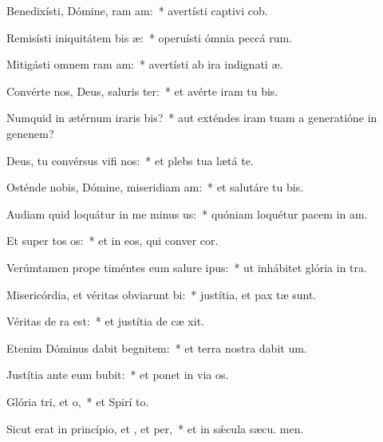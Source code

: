 \item Benedixísti, Dómine, ram am:~* avertísti captivi cob.
\item Remisísti iniquitátem bis æ:~* operuísti ómnia peccá rum.
\item Mitigásti omnem ram am:~* avertísti ab ira indignati æ.
\item Convérte nos, Deus, saluris ter:~* et avérte iram tu  bis.
\item Numquid in ætérnum iraris bis?~* aut exténdes iram tuam a generatióne in genenem?
\item Deus, tu convérsus vifi nos:~* et plebs tua lætá  te.
\item Osténde nobis, Dómine, miseridiam am:~* et salutáre tu  bis.
\item Audiam quid loquátur in me minus us:~* quóniam loquétur pacem in  am.
\item Et super tos os:~* et in eos, qui conver  cor.
\item Verúmtamen prope timéntes eum salure ipus:~* ut inhábitet glória in  tra.
\item Misericórdia, et véritas obviarunt bi:~* justítia, et pax tæ sunt.
\item Véritas de ra  est:~* et justítia de cæ xit.
\item Etenim Dóminus dabit begnitem:~* et terra nostra dabit  um.
\item Justítia ante eum bubit:~* et ponet in via  os.
\item Glória tri, et o,~* et Spirí to.
\item Sicut erat in princípio, et , et per,~* et in sǽcula sæcu. men.
